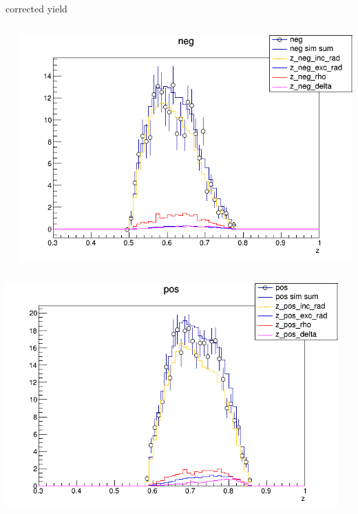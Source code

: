 \begin{frame}{corrected yield}
\begin{columns}
\begin{column}[T]{0.25\textwidth}
\end{column}
\begin{column}[T]{0.25\textwidth}
\includegraphics[width = \textwidth]{results/yield/statistics_corr/yield_x_Q2_z_0.40_4.000_0.60_neg.png}
\end{column}
\end{columns}
\begin{columns}
\begin{column}[T]{0.25\textwidth}
\includegraphics[width = \textwidth]{results/yield/statistics_corr/yield_x_Q2_z_0.40_4.000_0.70_pos.png}
\end{column}
\begin{column}[T]{0.25\textwidth}

\end{column}
\end{columns}
\end{frame}
